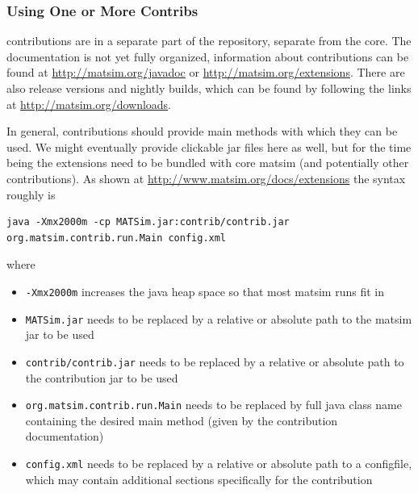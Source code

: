 \subsubsection{Using One or More Contribs}
\label{sec:using-contribs}

\Glspl{contribution} are in a separate part of the repository, separate from the core.  The documentation is not yet fully organized, information about \glspl{contribution} can be found at \url{http://matsim.org/javadoc} or \url{http://matsim.org/extensions}. There are also release versions and nightly builds, which can be found by following the links at %
\url{http://matsim.org/downloads}.

In general, \glspl{contribution} should provide main methods with which they can be used.  We might eventually provide clickable jar files here as well, but for the time being the extensions need to be bundled with core \gls{matsim} (and potentially other \glspl{contribution}). As shown at \url{http://www.matsim.org/docs/extensions} the syntax roughly is
\begin{lstlisting}
java -Xmx2000m -cp MATSim.jar:contrib/contrib.jar org.matsim.contrib.run.Main config.xml  
\end{lstlisting}
where
\begin{itemize}\styleItemize
\item \lstinline$-Xmx2000m$ increases the \gls{java} heap space so that most \gls{matsim} runs fit in
\item \lstinline$MATSim.jar$ needs to be replaced by a relative or absolute path to the \gls{matsim} jar to be used
\item \lstinline$contrib/contrib.jar$ needs to be replaced by a relative or absolute path to the \gls{contribution} jar to be used
\item \lstinline$org.matsim.contrib.run.Main$ needs to be replaced by full \gls{java} class name containing the desired main method (given by the \gls{contribution} documentation)
\item \lstinline$config.xml$ needs to be replaced by a relative or absolute path to a \gls{configfile}, which may contain additional sections specifically for the \gls{contribution}
\end{itemize}

